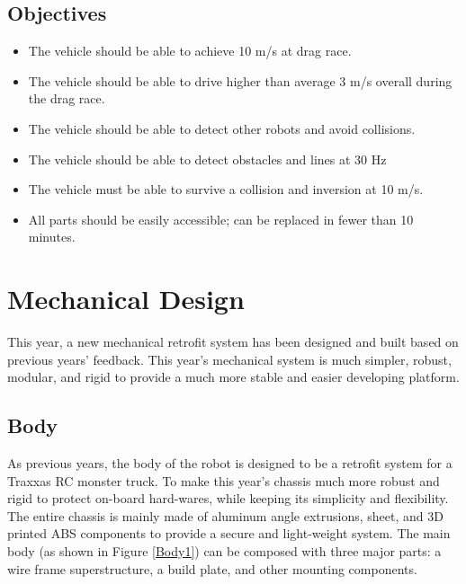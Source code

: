\documentclass[11pt,journal]{IEEEtran}
\begin{document}
\subsection{Objectives}
\begin{itemize}
    \item The vehicle should be able to achieve 10 m/s at drag race.
    \item The vehicle should be able to drive higher than average 3 m/s overall during the drag race.
    \item The vehicle should be able to detect other robots and avoid collisions.
    \item The vehicle should be able to detect obstacles and lines at 30 Hz
    \item The vehicle must be able to survive a collision and inversion at 10 m/s.
    \item All parts should be easily accessible; can be replaced in fewer than 10 minutes.
\end{itemize}
\section{Mechanical Design}
 This year, a new mechanical retrofit system has been designed and built based on previous years' feedback. This year's mechanical system is much simpler, robust, modular, and rigid to provide a much more stable and easier developing platform.

\subsection{Body}
 As previous years, the body of the robot is designed to be a retrofit system for a Traxxas RC monster truck. To make this year's chassis much more robust and rigid to protect on-board hard-wares, while keeping its simplicity and flexibility. The entire chassis is mainly made of aluminum angle extrusions, sheet, and 3D printed ABS components to provide a secure and light-weight system. The main body (as shown in Figure \ref{Body1}) can be composed with three major parts: a wire frame superstructure, a build plate, and other mounting components.
 
\end{document}
